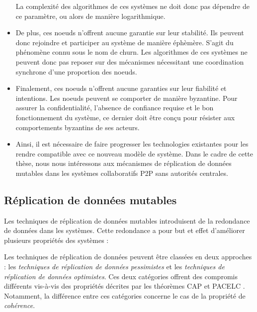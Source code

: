\begin{itemize}
      La complexité des algorithmes de ces systèmes ne doit donc pas dépendre de ce paramètre, ou alors de manière logarithmique.
    \item De plus, ces noeuds n'offrent aucune garantie sur leur stabilité.
      Ils peuvent donc rejoindre et participer au système de manière éphèmère.
      S'agit du phénomène connu sous le nom de churn.
      Les algorithmes de ces systèmes ne peuvent donc pas reposer sur des mécanismes nécessitant une coordination synchrone d'une proportion des noeuds.
    \item Finalement, ces noeuds n'offrent aucune garanties sur leur fiabilité et intentions.
      Les noeuds peuvent se comporter de manière byzantine.
      Pour assurer la confidentialité, l'absence de confiance requise et le bon fonctionnement du système, ce dernier doit être conçu pour résister aux comportements byzantins de ses acteurs.
    \item Ainsi, il est nécessaire de faire progresser les technologies existantes pour les rendre compatible avec ce nouveau modèle de système.
      Dans le cadre de cette thèse, nous nous intéressons aux mécanismes de réplication de données mutables dans les systèmes collaboratifs \ac{P2P} sans autorités centrales.
\end{itemize}

\subsection{Réplication de données mutables}

Les techniques de réplication de données mutables introduisent de la redondance de données dans les systèmes.
Cette redondance a pour but et effet d'améliorer plusieurs propriétés des systèmes :

\begin{definition}[Disponibilité]
\end{definition}

\begin{definition}
\end{definition}

\begin{definition}
\end{definition}

\begin{definition}[Latence]
\end{definition}

Les techniques de réplication de données peuvent être classées en deux approches : les \emph{techniques de réplication de données pessimistes} et les \emph{techniques de réplication de données optimistes}.
Ces deux catégories offrent des compromis différents vis-à-vis des propriétés décrites par les théorèmes CAP \cite{brewer_2000_podc} et PACELC \cite{pacelc2012}.
Notamment, la différence entre ces catégories concerne le cas de la propriété de \emph{cohérence}.

